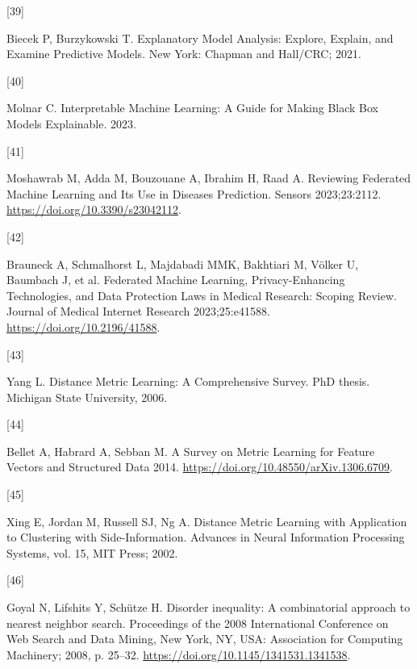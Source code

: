\documentclass[preprint, 3p,
authoryear]{elsarticle} %
\newlength{\cslhangindent}
\newlength{\csllabelwidth}
\newlength{\cslentryspacingunit} %
\newenvironment{CSLReferences}[2] %
 {%
  \setlength{\parindent}{0pt}
  \ifodd #1
  \let\oldpar\par
  \def\par{\hangindent=\cslhangindent\oldpar}
  \fi
  \setlength{\parskip}{#2\cslentryspacingunit}
 }%
 {}
\newcommand{\CSLLeftMargin}[1]{\parbox[t]{\csllabelwidth}{#1}}
\newcommand{\CSLRightInline}[1]{\parbox[t]{\linewidth - \csllabelwidth}{#1}\break}
\begin{document}
\begin{CSLReferences}{0}{0}
\leavevmode{}%
\CSLLeftMargin{{[}39{]} }%
\CSLRightInline{Biecek P, Burzykowski T. Explanatory {Model Analysis}:
{Explore}, {Explain}, and {Examine Predictive Models}. {New York}:
{Chapman and Hall/CRC}; 2021.}

\leavevmode{}%
\CSLLeftMargin{{[}40{]} }%
\CSLRightInline{Molnar C. Interpretable {Machine Learning}: {A Guide}
for {Making Black Box Models Explainable}. 2023.}

\leavevmode{}%
\CSLLeftMargin{{[}41{]} }%
\CSLRightInline{Moshawrab M, Adda M, Bouzouane A, Ibrahim H, Raad A.
Reviewing {Federated Machine Learning} and {Its Use} in {Diseases
Prediction}. Sensors 2023;23:2112.
\url{https://doi.org/10.3390/s23042112}.}

\leavevmode{}%
\CSLLeftMargin{{[}42{]} }%
\CSLRightInline{Brauneck A, Schmalhorst L, Majdabadi MMK, Bakhtiari M,
Völker U, Baumbach J, et al. Federated {Machine Learning},
{Privacy-Enhancing Technologies}, and {Data Protection Laws} in {Medical
Research}: {Scoping Review}. Journal of Medical Internet Research
2023;25:e41588. \url{https://doi.org/10.2196/41588}.}

\leavevmode{}%
\CSLLeftMargin{{[}43{]} }%
\CSLRightInline{Yang L. Distance {Metric Learning}: {A Comprehensive
Survey}. PhD thesis. Michigan State University, 2006.}

\leavevmode{}%
\CSLLeftMargin{{[}44{]} }%
\CSLRightInline{Bellet A, Habrard A, Sebban M. A {Survey} on {Metric
Learning} for {Feature Vectors} and {Structured Data} 2014.
\url{https://doi.org/10.48550/arXiv.1306.6709}.}

\leavevmode{}%
\CSLLeftMargin{{[}45{]} }%
\CSLRightInline{Xing E, Jordan M, Russell SJ, Ng A. Distance {Metric
Learning} with {Application} to {Clustering} with {Side-Information}.
Advances in {Neural Information Processing Systems}, vol. 15, {MIT
Press}; 2002.}

\leavevmode{}%
\CSLLeftMargin{{[}46{]} }%
\CSLRightInline{Goyal N, Lifshits Y, Schütze H. Disorder inequality: A
combinatorial approach to nearest neighbor search. Proceedings of the
2008 {International Conference} on {Web Search} and {Data Mining}, {New
York, NY, USA}: {Association for Computing Machinery}; 2008, p. 25--32.
\url{https://doi.org/10.1145/1341531.1341538}.}

\end{CSLReferences}
\end{document}
